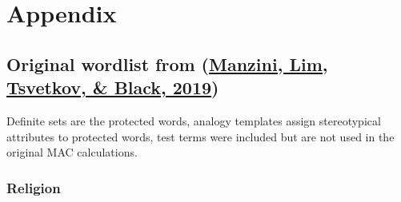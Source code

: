 \documentclass[
  12pt,
]{book}
\begin{document}
\hypertarget{appendix}{%
\chapter*{Appendix}\label{appendix}}

\hypertarget{original-wordlist-from-manzini2019blacktocriminal}{%
\section*{\texorpdfstring{Original wordlist from (\protect\hyperlink{ref-Manzini2019blackToCriminal}{Manzini, Lim, Tsvetkov, \& Black, 2019})}{Original wordlist from (Manzini, Lim, Tsvetkov, \& Black, 2019)}}\label{original-wordlist-from-manzini2019blacktocriminal}}

Definite sets are the protected words, analogy templates assign stereotypical attributes to protected words, test terms were included but are not used in the original MAC calculations.

\hypertarget{religion}{%
\subsection*{Religion}\label{religion}}

\vspace{1mm}
\scriptsize
\end{document}
